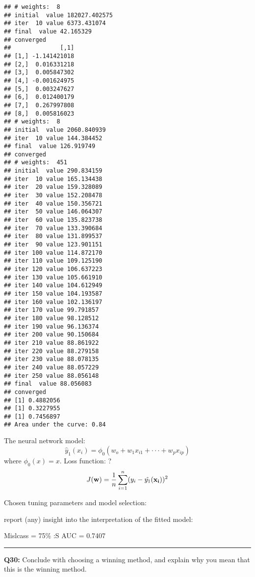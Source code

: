 \documentclass[]{article}
\begin{document}
\begin{verbatim}
## # weights:  8
## initial  value 182027.402575 
## iter  10 value 6373.431074
## final  value 42.165329 
## converged
##              [,1]
## [1,] -1.141421018
## [2,]  0.016331218
## [3,]  0.005847302
## [4,] -0.001624975
## [5,]  0.003247627
## [6,]  0.012400179
## [7,]  0.267997808
## [8,]  0.005816023
## # weights:  8
## initial  value 2060.840939 
## iter  10 value 144.384452
## final  value 126.919749 
## converged
## # weights:  451
## initial  value 290.834159 
## iter  10 value 165.134438
## iter  20 value 159.328089
## iter  30 value 152.208478
## iter  40 value 150.356721
## iter  50 value 146.064307
## iter  60 value 135.823738
## iter  70 value 133.390684
## iter  80 value 131.899537
## iter  90 value 123.901151
## iter 100 value 114.872170
## iter 110 value 109.125190
## iter 120 value 106.637223
## iter 130 value 105.661910
## iter 140 value 104.612949
## iter 150 value 104.193587
## iter 160 value 102.136197
## iter 170 value 99.791857
## iter 180 value 98.128512
## iter 190 value 96.136374
## iter 200 value 90.150684
## iter 210 value 88.861922
## iter 220 value 88.279158
## iter 230 value 88.078135
## iter 240 value 88.057229
## iter 250 value 88.056148
## final  value 88.056083 
## converged
## [1] 0.4882056
## [1] 0.3227955
## [1] 0.7456897
## Area under the curve: 0.84
\end{verbatim}

The neural network model:
\[\hat{y}_1(x_i)=\phi_0(w_o+w_1x_{i1}+\cdot\cdot\cdot+w_px_{ip})\] where
\(\phi_0(x)=x\). Loss function: ?
\[J({\bf w})=\frac{1}{n}\sum_{i=1}^{n}(y_i-\hat{y_1}({\bf x_i}))^2\]

Chosen tuning parameters and model selection:

report (any) insight into the interpretation of the fitted model:

Mislcass = 75\% :S AUC = 0.7407

\begin{center}\rule{0.5\linewidth}{\linethickness}\end{center}

\textbf{Q30:} Conclude with choosing a winning method, and explain why
you mean that this is the winning method.
\end{document}
